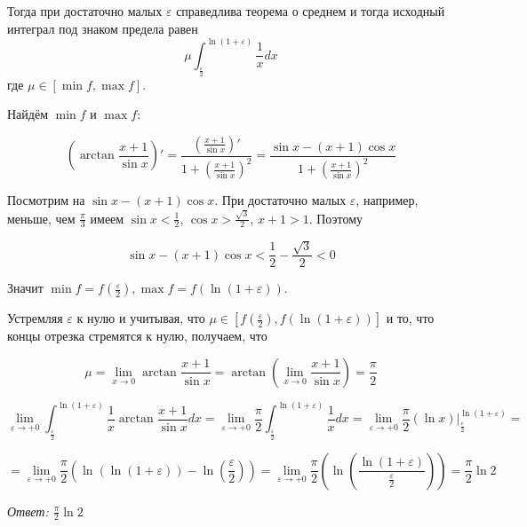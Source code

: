 \documentclass[a4paper]{article}
\begin{document}
Тогда при достаточно малых $\varepsilon$ справедлива теорема о среднем и тогда исходный интеграл под знаком предела равен \[\mu \int_{\frac{\varepsilon}{2}}^{\ln (1+\varepsilon)} \frac{1}{x} dx\] где $\mu \in [\min f, \max f]$.

Найдём $\min f$ и $\max f$:

\[
\left( \arctan \frac{x+1}{\sin x} \right)' = \frac{\left(\frac{x+1}{\sin x}\right)'}{1+\left( \frac{x+1}{\sin x} \right)^2} =  \frac{\sin x - (x+1) \cos x}{1+\left( \frac{x+1}{\sin x} \right)^2}
\]

Посмотрим на $\sin x - (x+1) \cos x$. При достаточно малых $\varepsilon$, например, меньше, чем $\frac{\pi}{3}$ имеем $\sin x < \frac{1}{2}$, $\cos x > \frac{\sqrt{3}}{2}$, $x+1>1$.
Поэтому 

\[
\sin x - (x+1) \cos x < \frac{1}{2} - \frac{\sqrt{3}}{2} < 0
\]

Значит $\min f = f \left( \frac{\varepsilon}{2} \right), \max f = f \left( \ln (1+ \varepsilon) \right)$.

Устремляя $\varepsilon$ к нулю и учитывая, что $\mu \in \left[ f \left( \frac{\varepsilon}{2} \right), f \left( \ln (1+ \varepsilon) \right) \right]$ и то, что концы отрезка стремятся к нулю, получаем, что 

\[\mu = 
\lim_{x \rightarrow 0} \arctan \frac{x+1}{\sin x} = \arctan \left( \lim_{x \rightarrow 0} \frac{x+1}{\sin x} \right) = \frac{\pi}{2}\]

\[\displaystyle \lim_{\varepsilon \rightarrow +0} \int_{\frac{\varepsilon}{2}}^{\ln (1+\varepsilon)} \frac{1}{x} \arctan \frac{x+1}{\sin x} dx = \lim_{\varepsilon \rightarrow +0}  \frac{\pi}{2} \int_{\frac{\varepsilon}{2}}^{\ln (1+\varepsilon)} \frac{1}{x} dx = \lim_{\varepsilon \rightarrow +0} \frac{\pi}{2} \left( \ln x \right) \bigg|_{\frac{\varepsilon}{2}}^{\ln (1+\varepsilon)} = 
\]

\[
= \lim_{\varepsilon \rightarrow +0} \frac{\pi}{2}\left( \ln \left( \ln (1+ \varepsilon) \right) - \ln \left( \frac{\varepsilon}{2} \right) \right) = \lim_{\varepsilon \rightarrow +0} \frac{\pi}{2}\left( \ln \left( \frac{\ln (1+\varepsilon)}{\frac{\varepsilon}{2}} \right) \right) = \frac{\pi}{2} \ln 2
\]

\textit{Ответ: $ \frac{\pi}{2} \ln 2$}
\end{document}
